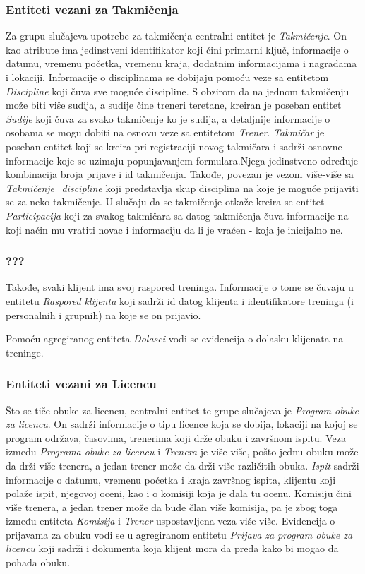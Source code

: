 \documentclass[../main.tex]{subfiles}
\begin{document}
\subsubsection{Entiteti vezani za Takmičenja}

Za grupu slučajeva upotrebe za takmičenja centralni entitet je \textit{Takmičenje}. On kao atribute ima jedinstveni identifikator koji čini primarni ključ, informacije o datumu, vremenu početka, vremenu kraja, dodatnim informacijama i nagradama i lokaciji. Informacije o disciplinama se dobijaju pomoću veze sa entitetom \textit{Discipline} koji čuva sve moguće discipline. S obzirom da na jednom takmičenju može biti više sudija, a sudije čine treneri teretane, kreiran je poseban entitet \textit{Sudije} koji čuva za svako takmičenje ko je sudija, a detaljnije informacije o osobama se mogu dobiti na osnovu veze sa entitetom \textit{Trener}. \textit{Takmičar} je poseban entitet koji se kreira pri registraciji novog takmičara i sadrži osnovne informacije koje se uzimaju popunjavanjem formulara.Njega jedinstveno određuje kombinacija broja prijave i id takmičenja. Takođe, povezan je vezom više-više sa \textit{Takmičenje\_discipline} koji predstavlja skup disciplina na koje je moguće prijaviti se za neko takmičenje. U slučaju da se takmičenje otkaže kreira se entitet \textit{Participacija} koji za svakog takmičara sa datog takmičenja čuva informacije na koji način mu vratiti novac i informaciju da li je vraćen - koja je inicijalno ne. 
\subsubsection{???}
Takođe, svaki klijent ima svoj raspored treninga. Informacije o tome se čuvaju u entitetu \textit{Raspored klijenta} koji sadrži id datog klijenta i identifikatore treninga (i personalnih i grupnih) na koje se on prijavio.

Pomoću agregiranog entiteta \textit{Dolasci} vodi se evidencija o dolasku klijenata na treninge.


\subsubsection{Entiteti vezani za Licencu}
Što se tiče obuke za licencu, centralni entitet te grupe slučajeva je \textit{Program obuke za licencu}. On sadrži informacije o tipu licence koja se dobija, lokaciji na kojoj se program održava, časovima, trenerima koji drže obuku i završnom ispitu. Veza između \textit{Programa obuke za licencu} i \textit{Trenera} je više-više, pošto jednu obuku može da drži više trenera, a jedan trener može da drži više različitih obuka. \textit{Ispit} sadrži informacije o datumu, vremenu početka i kraja završnog ispita, klijentu koji polaže ispit, njegovoj oceni, kao i o komisiji koja je dala tu ocenu. Komisiju čini više trenera, a jedan trener može da bude član više komisija, pa je zbog toga između entiteta \textit{Komisija} i \textit{Trener} uspostavljena veza više-više. Evidencija o prijavama za obuku vodi se u agregiranom entitetu \textit{Prijava za program obuke za licencu} koji sadrži i dokumenta koja klijent mora da preda kako bi mogao da pohađa obuku.
\end{document}
